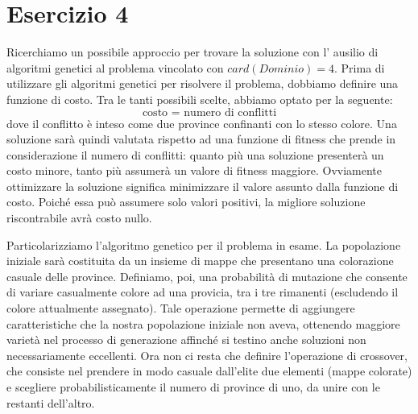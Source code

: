	\section{Esercizio 4}
		\label{sec:es4}
		Ricerchiamo un possibile approccio per trovare la soluzione con l' ausilio di algoritmi genetici al problema vincolato con $card(Dominio)=4$. Prima di utilizzare gli algoritmi genetici per risolvere il problema, dobbiamo definire una funzione di costo. Tra le tanti possibili scelte, abbiamo optato per la seguente: 
		\begin{equation*}
			\mbox{costo }=\mbox{ numero di conflitti}
		\end{equation*}
		dove il conflitto è inteso come due province confinanti con lo stesso colore. Una soluzione sarà quindi valutata rispetto ad una funzione di fitness che prende in considerazione il numero di conflitti: quanto più una soluzione presenterà un costo minore, tanto più assumerà un valore di fitness maggiore. Ovviamente ottimizzare la soluzione significa minimizzare il valore assunto dalla funzione di costo. Poiché essa può assumere solo valori positivi, la migliore soluzione riscontrabile avrà costo nullo.\par
		Particolarizziamo l'algoritmo genetico per il problema in esame. La popolazione iniziale sarà costituita da un insieme di mappe che presentano una colorazione casuale delle province. Definiamo, poi, una probabilità di mutazione che consente di variare casualmente colore ad una provicia, tra i tre rimanenti (escludendo il colore attualmente assegnato). Tale operazione permette di aggiungere caratteristiche che la nostra popolazione iniziale non aveva, ottenendo maggiore varietà nel processo di generazione affinché si testino anche soluzioni non necessariamente eccellenti. Ora non ci resta che definire l'operazione di crossover, che consiste nel prendere in modo casuale dall'elite due elementi (mappe colorate) e scegliere probabilisticamente il numero di province di uno, da unire con le restanti dell'altro. %
